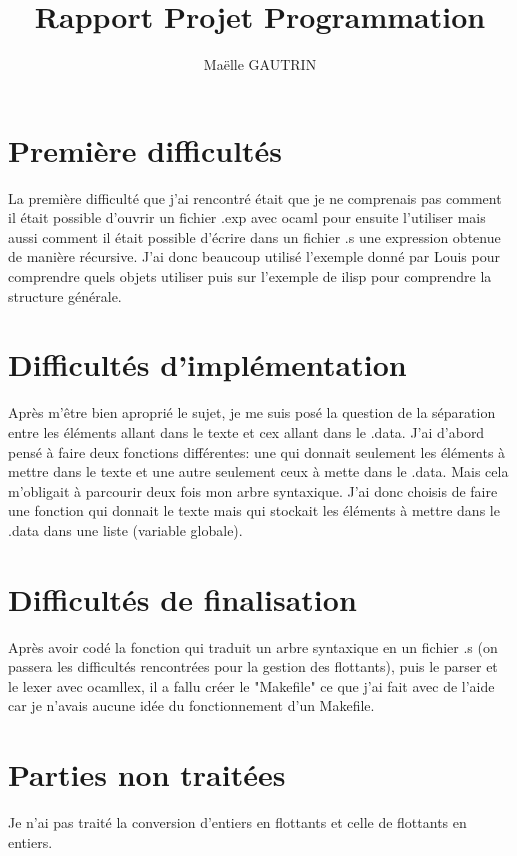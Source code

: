 \documentclass{article}
\title{Rapport Projet Programmation}
\author{Maëlle GAUTRIN}
\begin{document}
\maketitle

\section{Première difficultés}
La première difficulté que j'ai rencontré était que je ne comprenais pas comment il était possible d'ouvrir un fichier .exp avec ocaml pour ensuite l'utiliser mais aussi comment il était possible d'écrire dans un fichier .s une expression obtenue de manière récursive. J'ai donc beaucoup utilisé l'exemple donné par Louis pour comprendre quels objets utiliser puis sur l'exemple de ilisp pour comprendre la structure générale.

\section{Difficultés d'implémentation}
Après m'être bien aproprié le sujet, je me suis posé la question de la séparation entre les éléments allant dans le texte et cex allant dans le .data. J'ai d'abord pensé à faire deux fonctions différentes: une qui donnait seulement les éléments à mettre dans le texte et une autre seulement ceux à mette dans le .data. Mais cela m'obligait à parcourir deux fois mon arbre syntaxique. J'ai donc choisis de faire une fonction qui donnait le texte mais qui stockait les éléments à mettre dans le .data dans une liste (variable globale).

\section{Difficultés de finalisation}
Après avoir codé la fonction qui traduit un arbre syntaxique en un fichier .s (on passera les difficultés rencontrées pour la gestion des flottants), puis le parser et le lexer avec ocamllex, il a fallu créer le "Makefile" ce que j'ai fait avec de l'aide car je n'avais aucune idée du fonctionnement d'un Makefile.

\section{Parties non traitées}
Je n'ai pas traité la conversion d'entiers en flottants et celle de flottants en entiers.
\end{document}
